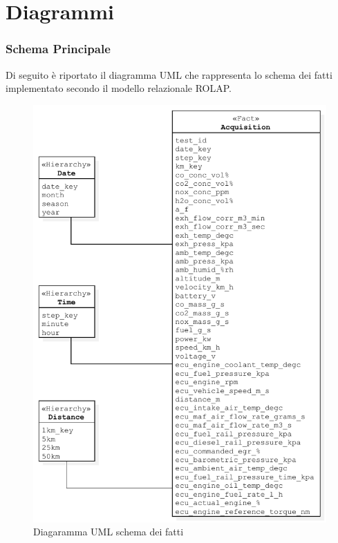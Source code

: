 \section{Diagrammi} \label{sec:diagrams}
\subsubsection{Schema Principale}
Di seguito è riportato il diagramma UML che rappresenta lo schema dei fatti implementato secondo il modello relazionale ROLAP.
\begin{figure}[H]
	\centering
	\includegraphics[scale=0.80]{figures/class_fact_scheme}
	\caption{Diagaramma UML schema dei fatti}
	\label{fig:ofm}
\end{figure}

